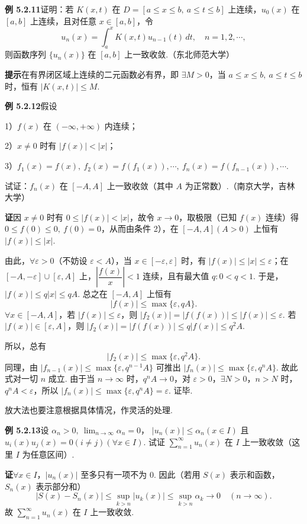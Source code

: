\documentclass[UTF8,12pt,a4paper,fontset=fandol]{ctexart}
\begin{document}
\noindent\textbf{例 5.2.11}\quad 证明：若 $K(x,t)$ 在
$D=[a\le x\le b,\ a\le t\le b]$ 上连续，$u_0(x)$ 在 $[a,b]$ 上连续，且对任意
$x\in[a,b]$，令
\[
  u_n(x)=\int_a^x K(x,t)u_{n-1}(t)\,dt,\quad n=1,2,\cdots,
\]
则函数序列 $\{u_n(x)\}$ 在 $[a,b]$ 上一致收敛.（东北师范大学）

\noindent\textbf{提示}\quad 在有界闭区域上连续的二元函数必有界，即 $\exists M>0$，当
$a\le x\le b,\ a\le t\le b$ 时，恒有 $|K(x,t)|\le M$.

\noindent\textbf{例 5.2.12}\quad 假设

1）$f(x)$ 在 $(-\infty,+\infty)$ 内连续；

2）$x\ne0$ 时有 $|f(x)|<|x|$；

3）$f_1(x)=f(x),\ f_2(x)=f(f_1(x)),\cdots,\ f_n(x)=f(f_{n-1}(x)),\cdots$.

试证：$f_n(x)$ 在 $[-A,A]$ 上一致收敛（其中 $A$ 为正常数）.（南京大学，吉林大学）

\noindent\textbf{证}\quad 因 $x\ne0$ 时有 $0\le |f(x)|<|x|$，故令 $x\to0$，取极限（已知
$f(x)$ 连续）得 $0\le f(0)\le0,\ f(0)=0$，从而由条件 2），在
$[-A,A](A>0)$ 上恒有 $|f(x)|\le |x|$.

由此，$\forall\varepsilon>0$（不妨设 $\varepsilon<A$），当
$x\in[-\varepsilon,\varepsilon]$ 时，有 $|f(x)|\le |x|\le\varepsilon$；在
$[-A,-\varepsilon]\cup[\varepsilon,A]$ 上，$\left|\dfrac{f(x)}{x}\right|<1$ 连续，且有最大值
$q:0<q<1$. 于是，$|f(x)|\le q|x|\le qA$. 总之在 $[-A,A]$ 上恒有
\[
  |f(x)|\le\max\{\varepsilon,qA\}.
\]
$\forall x\in[-A,A]$，若 $|f(x)|\le\varepsilon$，则
$|f_2(x)|=|f(f(x))|\le |f(x)|\le\varepsilon$.
若 $|f(x)|\in[\varepsilon,A]$，则
$|f_2(x)|=|f(f(x))|\le q|f(x)|\le q^2A$.

所以，总有
\[
  |f_2(x)|\le\max\{\varepsilon,q^2A\}.
\]
同理，由 $|f_{n-1}(x)|\le\max\{\varepsilon,q^{n-1}A\}$ 可推出
$|f_n(x)|\le\max\{\varepsilon,q^nA\}$. 故此式对一切 $n$ 成立. 由于当
$n\to\infty$ 时，$q^nA\to0$，对 $\varepsilon>0$，$\exists N>0$，$n>N$ 时，
$q^nA<\varepsilon$，所以 $|f_n(x)|\le\max\{\varepsilon,q^nA\}=\varepsilon$. 证毕.

放大法也要注意根据具体情况，作灵活的处理.

\noindent\textbf{例 5.2.13}\quad 设 $\alpha_n>0,\ \lim_{n\to\infty}\alpha_n=0$，
$|u_n(x)|\le\alpha_n(x\in I)$ 且 $u_i(x)u_j(x)=0(i\ne j)(\forall x\in I)$. 试证
$\displaystyle\sum_{n=1}^{\infty}u_n(x)$ 在 $I$ 上一致收敛（这里 $I$ 为任意区间）.

\noindent\textbf{证}\quad $\forall x\in I$，$|u_n(x)|$ 至多只有一项不为 $0$. 因此（若用
$S(x)$ 表示和函数，$S_n(x)$ 表示部分和）
\[
  |S(x)-S_n(x)|\le \sup_{k>n}|u_k(x)|\le \sup_{k>n}\alpha_k\to0\quad(n\to\infty).
\]
故 $\displaystyle\sum_{n=1}^{\infty}u_n(x)$ 在 $I$ 上一致收敛.
\end{document}
